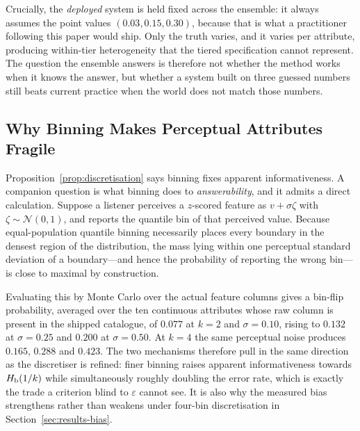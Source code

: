 Crucially, the \emph{deployed} system is held fixed across the ensemble: it
always assumes the point values $(0.03, 0.15, 0.30)$, because that is what a
practitioner following this paper would ship. Only the truth varies, and it
varies per attribute, producing within-tier heterogeneity that the tiered
specification cannot represent. The question the ensemble answers is therefore
not whether the method works when it knows the answer, but whether a system
built on three guessed numbers still beats current practice when the world does
not match those numbers.

\subsection{Why Binning Makes Perceptual Attributes Fragile}
\label{sec:psychophysical}

Proposition~\ref{prop:discretisation} says binning fixes apparent
informativeness. A companion question is what binning does to
\emph{answerability}, and it admits a direct calculation. Suppose a listener
perceives a $z$-scored feature as $v + \sigma\zeta$ with
$\zeta \sim \mathcal{N}(0,1)$, and reports the quantile bin of that perceived
value. Because equal-population quantile binning necessarily places every
boundary in the densest region of the distribution, the mass lying within one
perceptual standard deviation of a boundary---and hence the probability of
reporting the wrong bin---is close to maximal by construction.

Evaluating this by Monte Carlo over the actual feature columns gives a bin-flip
probability, averaged over the ten continuous attributes whose raw column is
present in the shipped catalogue, of $0.077$ at $k=2$ and $\sigma=0.10$, rising
to $0.132$ at $\sigma=0.25$ and $0.200$ at $\sigma=0.50$. At $k=4$ the same
perceptual noise produces $0.165$, $0.288$ and $0.423$. The two mechanisms
therefore pull in the same direction as the discretiser is refined: finer
binning raises apparent informativeness towards $H_{\mathrm{b}}(1/k)$ while simultaneously
roughly doubling the error rate, which is exactly the trade a criterion blind
to $\varepsilon$ cannot see. It is also why the measured bias strengthens
rather than weakens under four-bin discretisation in
Section~\ref{sec:results-bias}.

